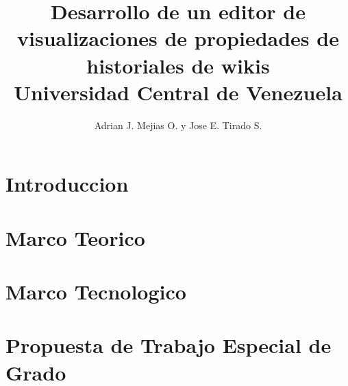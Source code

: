 \documentclass[12pt]{report}
\title{
	{Desarrollo de un editor de visualizaciones de propiedades de historiales de wikis}\\
	{\large Universidad Central de Venezuela}\\
}
\author{Adrian J. Mejias O. y Jose E. Tirado S.}
\begin{document}


\tableofcontents

\listoffigures

\chapter{Introduccion}


\chapter{Marco Teorico}


\chapter{Marco Tecnologico}


\chapter{Propuesta de Trabajo Especial de Grado}



\printbibliography
\end{document}
